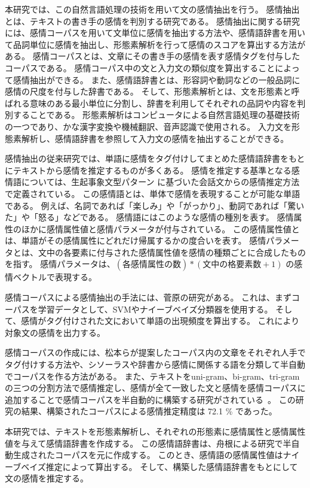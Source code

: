 \documentclass[11pt,a4j]{jsarticle}
\begin{document}
本研究では、この自然言語処理の技術を用いて文の感情抽出を行う。
感情抽出とは、テキストの書き手の感情を判別する研究である。
感情抽出に関する研究には、感情コーパスを用いて文単位に感情を抽出する方法や、感情語辞書を用いて品詞単位に感情を抽出し、形態素解析を行って感情のスコアを算出する方法がある。
感情コーパスとは、文章にその書き手の感情を表す感情タグを付与したコーパスである。
感情コーパス中の文と入力文の類似度を算出することによって感情抽出ができる。
また、感情語辞書とは、形容詞や動詞などの一般品詞に感情の尺度を付与した辞書である。
そして、形態素解析とは、文を形態素と呼ばれる意味のある最小単位に分割し、辞書を利用してそれぞれの品詞や内容を判別することである。
形態素解析はコンピュータによる自然言語処理の基礎技術の一つであり、かな漢字変換や機械翻訳、音声認識で使用される。
入力文を形態素解析し、感情語辞書を参照して入力文の感情を抽出することができる。

感情抽出の従来研究では、単語に感情をタグ付けしてまとめた感情語辞書をもとにテキストから感情を推定するものが多くある。
感情を推定する基準となる感情語については、生起事象文型パターン  に基づいた会話文からの感情推定方法で定義されている。
この感情語とは、単体で感情を表現することが可能な単語である。
例えば、名詞であれば「楽しみ」や「がっかり」、動詞であれば「驚いた」や「怒る」などである。
感情語にはこのような感情の種別を表す。
感情属性のほかに感情属性値と感情パラメータが付与されている。
この感情属性値とは、単語がその感情属性にどれだけ帰属するかの度合いを表す。
感情パラメータとは、文中の各要素に付与された感情属性値を感情の種類ごとに合成したものを指す。
感情パラメータは、$(各感情属性の数) * (文中の格要素数 +1)$ の感情ベクトルで表現する。

感情コーパスによる感情抽出の手法には、菅原の研究がある。
これは、まずコーパスを学習データとして、SVMやナイーブベイズ分類器を使用する。
そして、感情がタグ付けされた文において単語の出現頻度を算出する。
これにより対象文の感情を出力する。

感情コーパスの作成には、松本らが提案したコーパス内の文章をそれぞれ人手でタグ付けする方法や、シソーラスや辞書から感情に関係する語を分類して半自動でコーパスを作る方法がある。
また、テキストをuni-gram、bi-gram、tri-gram の三つの分割方法で感情推定し、感情が全て一致した文と感情を感情コーパスに追加することで感情コーパスを半自動的に構築する研究がされている~。
この研究の結果、構築されたコーパスによる感情推定精度は 72.1 \% であった。

本研究では、テキストを形態素解析し、それぞれの形態素に感情属性と感情属性値を与えて感情語辞書を作成する。
この感情語辞書は、舟根による研究で半自動生成されたコーパスを元に作成する。
このとき、感情語の感情属性値はナイーブベイズ推定によって算出する。
そして、構築した感情語辞書をもとにして文の感情を推定する。
\end{document}
